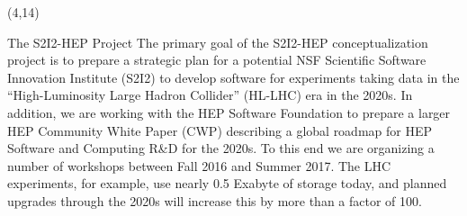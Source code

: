 \documentclass[final]{beamer}
\begin{document}
\begin{frame}{}
\begin{textblock}{78.0}(4,14)
\begin{block}{The S2I2-HEP Project}
The primary goal of the S2I2-HEP conceptualization project is to
prepare a strategic plan for a potential NSF Scientific Software
Innovation Institute (S2I2) to develop software for experiments
taking data in the ``High-Luminosity Large Hadron Collider'' (HL-LHC)
era in the 2020s. In addition, we are working with the HEP Software
Foundation to prepare a larger HEP Community White Paper (CWP)
describing a global roadmap for HEP Software and Computing R\&D for
the 2020s. To this end we are organizing a number of workshops
between Fall 2016 and Summer 2017.
The LHC experiments, for example, use nearly 0.5 Exabyte of
storage today, and planned upgrades through the 2020s will increase this
by more than a factor of 100. 
\end{block}
\end{textblock}


\end{frame}
\end{document}

